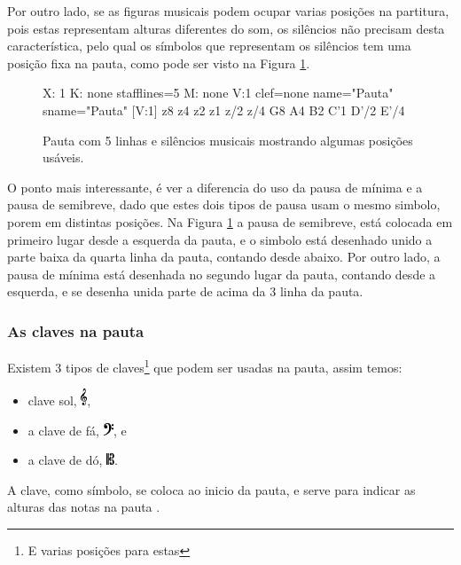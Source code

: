 Por outro lado, se as figuras musicais podem ocupar varias posições na partitura,
pois estas representam alturas diferentes  do som,
os silêncios não precisam desta característica,
pelo qual os símbolos que representam os silêncios tem uma posição fixa na pauta,
como pode ser visto na Figura \ref{fig:abc-pautasilencio}.
\begin{figure}[h]
\centering
\begin{abc}[name=abc-pautasilencio]
%
X: 1 %
K: none stafflines=5 %
M: none %
V:1 clef=none name="Pauta"   sname="Pauta"
%
[V:1] z8 z4 z2 z1 z/2 z/4 G8 A4 B2 C'1 D'/2 E'/4 
\end{abc}
\caption{Pauta com 5 linhas e silêncios musicais mostrando algumas posições usáveis.}
\label{fig:abc-pautasilencio}
\end{figure}
O ponto mais interessante, é ver a diferencia do uso  da pausa de mínima e a pausa de semibreve,
dado que estes dois tipos de pausa usam o mesmo simbolo, porem em distintas posições.
Na Figura \ref{fig:abc-pautasilencio} a pausa de semibreve, 
está colocada em primeiro lugar desde a esquerda da pauta,
e o simbolo está desenhado unido a parte baixa da quarta linha da pauta, contando desde abaixo.
Por outro lado, a pausa de mínima está desenhada no segundo lugar da pauta,
contando desde a esquerda, e se desenha unida parte de acima da 3 linha da pauta.

\subsubsection{As claves na pauta}
Existem 3 tipos de claves\footnote{E varias posições para estas} que podem ser usadas na pauta, 
assim temos: 
\begin{itemize}
\item clave sol, \includegraphics[height=14pt]{chapters/cap-musica-basica/G-clef.eps},
\item a clave de fá, \includegraphics[height=10pt]{chapters/cap-musica-basica/FClef.eps}, e 
\item a clave de dó, \includegraphics[height=10pt]{chapters/cap-musica-basica/CClef.eps}.
\end{itemize}
A clave, como símbolo, se coloca ao inicio da pauta, e serve para indicar as alturas das notas na pauta \cite[pp. 179]{apel1969harvard} \cite[pp. 10]{cardoso1973curso}.

